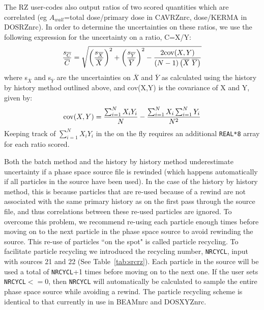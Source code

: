 \documentclass[12pt,twoside]{article}  %
\begin{document}
The RZ user-codes also output ratios of two scored quantities
which are correlated (eg $A_{wall}$=total dose/primary dose in CAVRZnrc,
dose/KERMA in DOSRZnrc).  In order to determine the uncertainties on these
ratios, we use the following expression for the uncertainty on a
ratio, C=X/Y:
\begin{equation}
\frac{s_{\overline{C}}}{\overline{C}} =
\sqrt{\left({\frac{s_{\overline{X}}}{\overline{X}}}\right)^2 +
\left({\frac{s_{\overline{Y}}}{\overline{Y}}}\right)^2 - \frac{2{\rm cov}(X,Y)}
{\left(N-1\right)\left(\overline{X}~\overline{Y}\right)}}
\end{equation}
where s$_{\overline{X}}$ and s$_{\overline{Y}}$ are the uncertainties on
$\overline{X}$ and $\overline{Y}$ as calculated using the history by
history method outlined above, and cov(X,Y) is the covariance of X and Y, given by:
\begin{equation}
{\rm cov}(X,Y)=\frac{\sum_{i=1}^{N}X_iY_i}{N}-\frac{\sum_{i=1}^{N}X_i\sum_{i=1}^{N}Y_i}{N^2}
\label{coveq}
\end{equation}
Keeping track of $\sum_{i=1}^{N}X_iY_i$ in the  on the fly
requires an additional {\tt REAL*8} array for each ratio scored.

Both the batch method and the history by history method underestimate
uncertainty if a phase space source file is rewinded (which happens
automatically if all particles in the source have been used).  In the
case of the history by history method, this is because particles
that are re-used because of a rewind are not associated with the
same primary history as on the first pass through the source file,
and thus correlations between these re-used particles are ignored.
To overcome this problem, we recommend re-using each particle enough
times before moving on to the next particle in the phase space source to
avoid rewinding the source.  This re-use of particles ``on the spot"
is called particle recycling.  To facilitate particle recycling we
introduced the recycling number, {\tt NRCYCL}, input with sources 21
and 22 (See Table~\ref{tab:srcrz}).  Each particle in the source will be
used a total of {\tt NRCYCL}+1 times before moving on to the next one.
If the user sets {\tt NRCYCL}$<=$0, then {\tt NRCYCL} will automatically
be calculated to sample the entire phase space source while avoiding
a rewind.  The particle recycling scheme is identical to that currently
in use in BEAMnrc and DOSXYZnrc.
\end{document}
